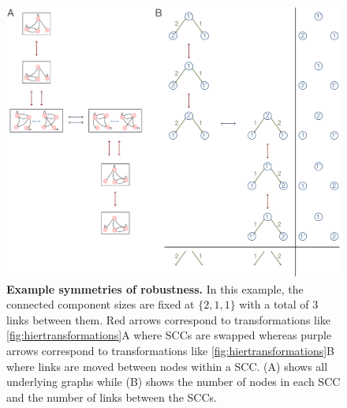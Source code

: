 \begin{figure}[!ht]
\centering
\noindent\includegraphics[width=0.9\columnwidth]{fig/robustnesssymmetries.pdf}
\caption{{\bf Example symmetries of robustness.} In this example, the connected component sizes are fixed at $\{2,1,1\}$ with a total of $3$ links between them. Red arrows correspond to transformations like \ref{fig:hiertransformations}A where SCCs are swapped whereas purple arrows correspond to transformations like \ref{fig:hiertransformations}B where links are moved between nodes within a SCC. (A) shows all underlying graphs while (B) shows the number of nodes in each SCC and the number of links between the SCCs.}
\label{fig:robustnesssymmetries}
\end{figure}
